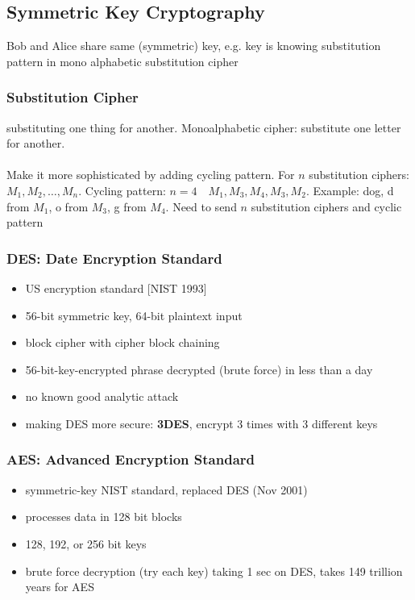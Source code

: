 \subsection{Symmetric Key Cryptography}
Bob and Alice share same (symmetric) key, e.g. key is knowing substitution pattern in mono alphabetic substitution cipher
\subsubsection{Substitution Cipher}
substituting one thing for another. Monoalphabetic cipher: substitute one letter for another.\\\\
Make it more sophisticated by adding cycling pattern. For $n$ substitution ciphers: $M_1, M_2, \ldots, M_n$. Cycling pattern: $n=4\quad M_1,M_3,M_4,M_3,M_2$. Example: dog, d from $M_1$, o from $M_3$, g from $M_4$. Need to send $n$ substitution ciphers and cyclic pattern
\subsubsection{DES: Date Encryption Standard}
\begin{itemize}
	\item US encryption standard [NIST 1993]
	\item 56-bit symmetric key, 64-bit plaintext input
	\item block cipher with cipher block chaining
	\item 56-bit-key-encrypted phrase decrypted (brute force) in less than a day
	\item no known good analytic attack
	\item making DES more secure: \textbf{3DES}, encrypt 3 times with 3 different keys
\end{itemize}
\subsubsection{AES: Advanced Encryption Standard}
\begin{itemize}
	\item symmetric-key NIST standard, replaced DES (Nov 2001)
	\item processes data in 128 bit blocks
	\item 128, 192, or 256 bit keys
	\item brute force decryption (try each key) taking 1 sec on DES, takes 149 trillion years for AES
\end{itemize}

